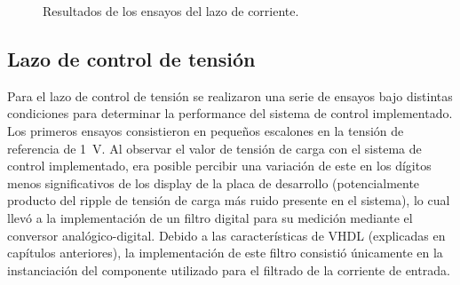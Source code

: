 \begin{figure}[hbt!]
  \centering
  \caption{Resultados de los ensayos del lazo de corriente.}
  \label{escalones-lazo-corriente}
\end{figure}

\subsection{Lazo de control de tensión}

Para el lazo de control de tensión se realizaron una serie de ensayos bajo distintas condiciones para determinar la performance del sistema de control implementado. Los primeros ensayos consistieron en pequeños escalones en la tensión de referencia de \SI{1}{\volt}. Al observar el valor de tensión de carga con el sistema de control implementado, era posible percibir una variación de este en los dígitos menos significativos de los display de la placa de desarrollo (potencialmente producto del ripple de tensión de carga más ruido presente en el sistema), lo cual llevó a la implementación de un filtro digital para su medición mediante el conversor analógico-digital. Debido a las características de VHDL (explicadas en capítulos anteriores), la implementación de este filtro consistió únicamente en la instanciación del componente utilizado para el filtrado de la corriente de entrada.

